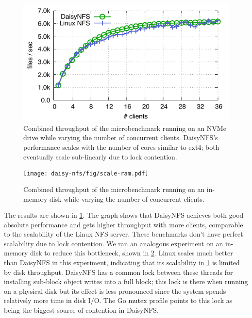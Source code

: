 \begin{figure}[hp]
  \includegraphics{daisy-nfs/fig/scale.pdf}
  \caption[Concurrent smallfile performance]%
{Combined throughput of the  microbenchmark running on
    an NVMe drive while
    varying the number of concurrent clients. DaisyNFS's performance scales with the
    number of cores similar to ext4; both eventually scale
    sub-linearly due to lock contention. }
  \label{fig:eval:scale}
\end{figure}

\begin{figure}[hp]
  \texttt{[image: daisy-nfs/fig/scale-ram.pdf]}
  \caption[Concurrent smallfile performance, with RAM disk]%
  {Combined throughput of the  microbenchmark running on an
    in-memory disk while varying the number of concurrent clients.}
  \label{fig:eval:scale-ram}
\end{figure}

The results are shown in \cref{fig:eval:scale}. The graph shows that DaisyNFS
achieves both good absolute performance and gets higher throughput with more
clients, comparable to the scalability of the Linux NFS server. These benchmarks
don't have perfect scalability due to lock contention. We ran an analogous experiment on an
in-memory disk to reduce this bottleneck, shown in \cref{fig:eval:scale-ram}.
Linux scales much better than DaisyNFS in this experiment, indicating that its
scalability in \cref{fig:eval:scale} is limited by disk throughput. DaisyNFS has a common
lock between these threads for installing sub-block object writes into a full
block; this lock is there when running on a physical disk but its effect is less
pronounced since the system spends relatively more time in disk I/O. The Go
mutex profile points to this lock as being the biggest source of contention in
DaisyNFS.

